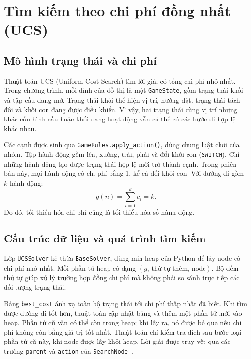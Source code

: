 \section{Tìm kiếm theo chi phí đồng nhất (UCS)}
\label{sec:ucs}

\subsection{Mô hình trạng thái và chi phí}

Thuật toán UCS (Uniform-Cost Search) tìm lời giải có tổng chi phí nhỏ nhất.
Trong chương trình, mỗi đỉnh của đồ thị là một \texttt{GameState}, gồm trạng
thái khối và tập cầu đang mở. Trạng thái khối thể hiện vị trí, hướng đặt,
trạng thái tách đôi và khối con đang được điều khiển. Vì vậy, hai trạng thái
cùng vị trí nhưng khác cấu hình cầu hoặc khối đang hoạt động vẫn có thể có
các bước đi hợp lệ khác nhau.

Các cạnh được sinh qua \texttt{GameRules.apply\_action()}, dùng chung luật chơi
của nhóm. Tập hành động gồm lên, xuống, trái, phải và đổi khối con
(\texttt{SWITCH}). Chỉ những hành động tạo được trạng thái hợp lệ mới trở
thành cạnh. Trong phiên bản này, mọi hành động có chi phí bằng 1, kể cả đổi
khối con. Với đường đi gồm $k$ hành động:
\[
    g(n)=\sum_{i=1}^{k}c_i=k.
\]
Do đó, tối thiểu hóa chi phí cũng là tối thiểu hóa số hành động.

\subsection{Cấu trúc dữ liệu và quá trình tìm kiếm}

Lớp \texttt{UCSSolver} kế thừa \texttt{BaseSolver}, dùng min-heap của Python
để lấy node có chi phí nhỏ nhất. Mỗi phần tử heap có dạng
$(g,\,\text{thứ tự thêm},\,\text{node})$. Bộ đếm thứ tự giúp xử lý trường hợp
đồng chi phí mà không phải so sánh trực tiếp các đối tượng trạng thái.

Bảng \texttt{best\_cost} ánh xạ toàn bộ trạng thái tới chi phí thấp nhất đã
biết. Khi tìm được đường đi tốt hơn, thuật toán cập nhật bảng và thêm một
phần tử mới vào heap. Phần tử cũ vẫn có thể còn trong heap; khi lấy ra, nó
được bỏ qua nếu chi phí không còn bằng giá trị tốt nhất. Thuật toán chỉ
kiểm tra đích sau bước loại phần tử cũ này, khi node được lấy khỏi heap.
Lời giải được truy vết qua các trường \texttt{parent} và \texttt{action}
của \texttt{SearchNode}~\cite{bloxorz_ucs_source}.

